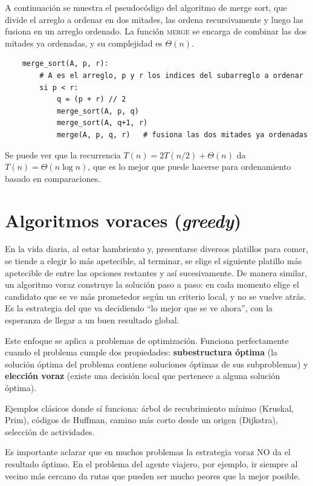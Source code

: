 \documentclass[12pt,letterpaper]{article}
\begin{document}
A continuación se muestra el pseudocódigo del algoritmo de merge sort, 
que divide el arreglo a ordenar en dos mitades, las ordena recursivamente y 
luego las fusiona en un arreglo ordenado. La función \textsc{merge} se encarga 
de combinar las dos mitades ya ordenadas, y su complejidad es $\Theta(n)$.

\begin{verbatim}
    merge_sort(A, p, r):
        # A es el arreglo, p y r los indices del subarreglo a ordenar
        si p < r:
            q = (p + r) // 2
            merge_sort(A, p, q)
            merge_sort(A, q+1, r)
            merge(A, p, q, r)   # fusiona las dos mitades ya ordenadas
\end{verbatim}

Se puede ver que la recurrencia $T(n) = 2T(n/2) + \Theta(n)$ da $T(n) = 
\Theta(n \log n)$, que es lo mejor que puede hacerse para ordenamiento basado 
en comparaciones.

\section{Algoritmos voraces (\emph{greedy})}
\label{sec:greedy}

En la vida diaria, al estar hambriento y, presentarse diversos platillos para 
comer, se tiende a elegir lo más apetecible, al terminar, se elige el siguiente 
platillo más apetecible de entre las opciones restantes y así sucesivamente. 
De manera similar, un algoritmo voraz construye la solución paso a paso: en 
cada momento elige el candidato que se ve más prometedor según un criterio 
local, y no se vuelve atrás. Es la estrategia del que va decidiendo 
``lo mejor que se ve ahora'', con la esperanza de llegar a un buen resultado 
global.

Este enfoque se aplica a problemas de optimización. Funciona perfectamente 
cuando el problema cumple dos propiedades: 
\textbf{subestructura óptima} (la solución óptima del problema contiene 
soluciones óptimas de sus subproblemas) y \textbf{elección voraz} 
(existe una decisión local que pertenece a alguna solución óptima).

Ejemplos clásicos donde sí funciona: árbol de recubrimiento mínimo 
(Kruskal, Prim), códigos de Huffman, camino más corto desde un origen 
(Dijkstra), selección de actividades.

Es importante aclarar que en muchos problemas la estrategia voraz NO da el 
resultado óptimo. En el problema del agente viajero, por ejemplo, ir siempre 
al vecino más cercano da rutas que pueden ser mucho peores que la mejor posible.
\end{document}
